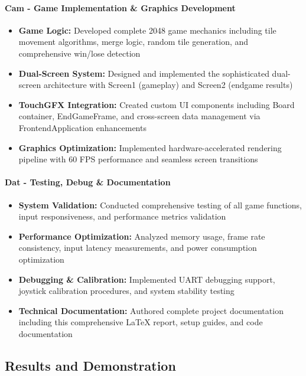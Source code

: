 \documentclass[12pt,a4paper]{article}
\begin{document}
\paragraph{Cam - Game Implementation \& Graphics Development}
\begin{itemize}[leftmargin=*]
    \item \textbf{Game Logic:} Developed complete 2048 game mechanics including tile movement algorithms, merge logic, random tile generation, and comprehensive win/lose detection
    \item \textbf{Dual-Screen System:} Designed and implemented the sophisticated dual-screen architecture with Screen1 (gameplay) and Screen2 (endgame results)
    \item \textbf{TouchGFX Integration:} Created custom UI components including Board container, EndGameFrame, and cross-screen data management via FrontendApplication enhancements
    \item \textbf{Graphics Optimization:} Implemented hardware-accelerated rendering pipeline with 60 FPS performance and seamless screen transitions
\end{itemize}

\paragraph{Dat - Testing, Debug \& Documentation}
\begin{itemize}[leftmargin=*]
    \item \textbf{System Validation:} Conducted comprehensive testing of all game functions, input responsiveness, and performance metrics validation
    \item \textbf{Performance Optimization:} Analyzed memory usage, frame rate consistency, input latency measurements, and power consumption optimization
    \item \textbf{Debugging \& Calibration:} Implemented UART debugging support, joystick calibration procedures, and system stability testing
    \item \textbf{Technical Documentation:} Authored complete project documentation including this comprehensive LaTeX report, setup guides, and code documentation
\end{itemize}

\subsection{Results and Demonstration}
\end{document}
